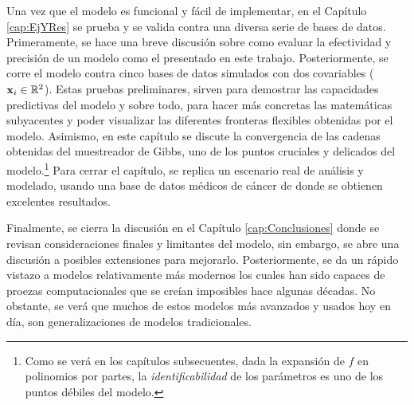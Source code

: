 \documentclass[../Main/Main.tex]{subfiles}
\begin{document}
Una vez que el modelo es funcional y fácil de implementar, en el Capítulo \ref{cap:EjYRes} se prueba y se valida contra una diversa serie de bases de datos. Primeramente, se hace una breve discusión sobre como evaluar la efectividad y precisión de un modelo como el presentado en este trabajo. Posteriormente, se corre el modelo contra cinco bases de datos simulados con dos covariables ($\mathbf{x}_i \in \mathbb{R}^2$). Estas pruebas preliminares, sirven para demostrar las capacidades predictivas del modelo y sobre todo, para hacer más concretas las matemáticas subyacentes y poder visualizar las diferentes fronteras flexibles obtenidas por el modelo. Asimismo, en este capítulo se discute la convergencia de las cadenas obtenidas del muestreador de Gibbs, uno de los puntos cruciales y delicados del modelo.\footnote{Como se verá en los capítulos subsecuentes, dada la expansión de $f$ en polinomios por partes, la \textit{identificabilidad} de los parámetros es uno de los puntos débiles del modelo.} Para cerrar el capítulo, se replica un escenario real de análisis y modelado, usando una base de datos médicos de cáncer de donde se obtienen excelentes resultados.

Finalmente, se cierra la discusión en el Capítulo \ref{cap:Conclusiones} donde se revisan consideraciones finales y limitantes del modelo, sin embargo, se abre una discusión a posibles extensiones para mejorarlo. Posteriormente, se da un rápido vistazo a modelos relativamente más modernos los cuales han sido capaces de proezas computacionales que se creían imposibles hace algunas décadas. No obstante, se verá que muchos de estos modelos más avanzados y usados hoy en día, son generalizaciones de modelos tradicionales. 
\end{document}
